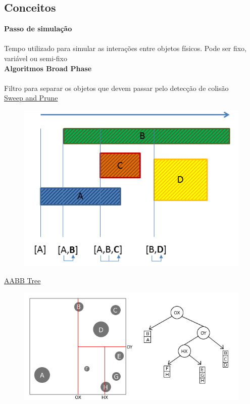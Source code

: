 \documentclass[plainboxedsections]{sciposter}
\begin{document}
\begin{multicols}{2}
  \section*{Conceitos}
  \textbf{Passo de simulação} \\
  \\[1ex]
  Tempo utilizado para simular as interações entre objetos físicos. Pode ser fixo, variável ou semi-fixo
  \\[2ex]
  \textbf{Algoritmos Broad Phase} \\
  \\[1ex]
  Filtro para separar os objetos que devem passar pelo detecção de colisão
  \\[1ex]
  \underline{Sweep and Prune}\\
  \begin{figure}
    \includegraphics[scale=2]{sp.png}
  \end{figure}
  \underline{AABB Tree}\\
  \begin{figure}
    \includegraphics[scale=1.5]{aabb.png}

\end{figure}
\end{multicols}
\end{document}
